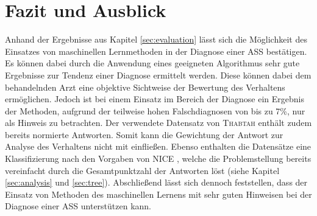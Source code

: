 \section{Fazit und Ausblick}
Anhand der Ergebnisse aus Kapitel \ref{sec:evaluation} lässt sich die Möglichkeit des Einsatzes von maschinellen Lernmethoden in der Diagnose einer ASS bestätigen. Es können dabei durch die Anwendung eines geeigneten Algorithmus sehr gute Ergebnisse zur Tendenz einer Diagnose ermittelt werden. Diese können dabei dem behandelnden Arzt eine objektive Sichtweise der Bewertung des Verhaltens ermöglichen. Jedoch ist bei einem Einsatz im Bereich der Diagnose ein Ergebnis der Methoden, aufgrund der teilweise hohen Falschdiagnosen von bis zu 7\%, nur als Hinweis zu betrachten. 
Der verwendete Datensatz von \textsc{Thabtah} \cite{Thabtah2017, Thabtah, Thabtah2018} enthält zudem bereits normierte Antworten. Somit kann die Gewichtung der Antwort zur Analyse des Verhaltens nicht mit einfließen. Ebenso enthalten die Datensätze eine Klassifizierung nach den Vorgaben von \textsc{NICE} \cite{NICE2012}, welche die Problemstellung bereits vereinfacht durch die Gesamtpunktzahl der Antworten löst (siehe Kapitel \ref{sec:analysis} und \ref{sec:tree}). Abschließend lässt sich dennoch feststellen, dass der Einsatz von Methoden des maschinellen Lernens mit sehr guten Hinweisen bei der Diagnose einer ASS unterstützen kann.
